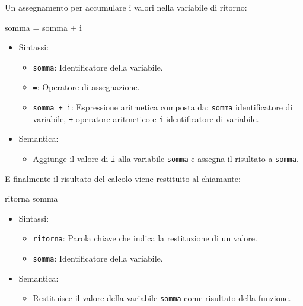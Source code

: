 \documentclass[
  letterpaper,
  DIV=11,
  numbers=noendperiod]{scrreprt}
\newenvironment{Shaded}{\begin{snugshade}}{\end{snugshade}}
\newcommand{\NormalTok}[1]{\textcolor[rgb]{0.00,0.23,0.31}{#1}}
\providecommand{\tightlist}{%
  \setlength{\itemsep}{0pt}\setlength{\parskip}{0pt}}\usepackage{longtable,booktabs,array}
\begin{document}
Un assegnamento per accumulare i valori nella variabile di ritorno:

\begin{Shaded}
\begin{Highlighting}[]
\NormalTok{somma = somma + i}
\end{Highlighting}
\end{Shaded}

\begin{itemize}
\tightlist
\item
  Sintassi:

  \begin{itemize}
  \tightlist
  \item
    \texttt{somma}: Identificatore della variabile.
  \item
    \texttt{=}: Operatore di assegnazione.
  \item
    \texttt{somma\ +\ i}: Espressione aritmetica composta da:
    \texttt{somma} identificatore di variabile, \texttt{+} operatore
    aritmetico e \texttt{i} identificatore di variabile.
  \end{itemize}
\item
  Semantica:

  \begin{itemize}
  \tightlist
  \item
    Aggiunge il valore di \texttt{i} alla variabile \texttt{somma} e
    assegna il risultato a \texttt{somma}.
  \end{itemize}
\end{itemize}

E finalmente il risultato del calcolo viene restituito al chiamante:

\begin{Shaded}
\begin{Highlighting}[]
\NormalTok{ritorna somma}
\end{Highlighting}
\end{Shaded}

\begin{itemize}
\tightlist
\item
  Sintassi:

  \begin{itemize}
  \tightlist
  \item
    \texttt{ritorna}: Parola chiave che indica la restituzione di un
    valore.
  \item
    \texttt{somma}: Identificatore della variabile.
  \end{itemize}
\item
  Semantica:

  \begin{itemize}
  \tightlist
  \item
    Restituisce il valore della variabile \texttt{somma} come risultato
    della funzione.
  \end{itemize}
\end{itemize}
\end{document}
